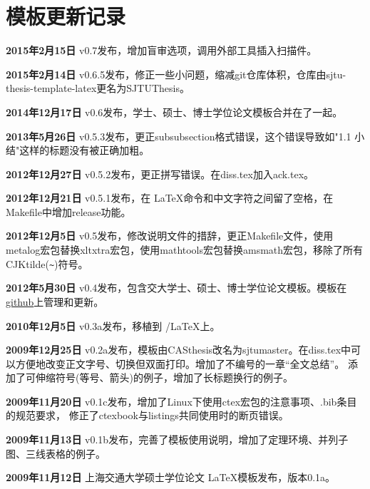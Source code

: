 \chapter{模板更新记录}
\label{chap:updatelog}

\textbf{2015年2月15日} v0.7发布，增加盲审选项，调用外部工具插入扫描件。

\textbf{2015年2月14日} v0.6.5发布，修正一些小问题，缩减git仓库体积，仓库由sjtu-thesis-template-latex更名为SJTUThesis。

\textbf{2014年12月17日} v0.6发布，学士、硕士、博士学位论文模板合并在了一起。

\textbf{2013年5月26日} v0.5.3发布，更正subsubsection格式错误，这个错误导致如"1.1 小结"这样的标题没有被正确加粗。

\textbf{2012年12月27日} v0.5.2发布，更正拼写错误。在diss.tex加入ack.tex。

\textbf{2012年12月21日} v0.5.1发布，在 \LaTeX 命令和中文字符之间留了空格，在Makefile中增加release功能。

\textbf{2012年12月5日} v0.5发布，修改说明文件的措辞，更正Makefile文件，使用metalog宏包替换xltxtra宏包，使用mathtools宏包替换amsmath宏包，移除了所有CJKtilde(\verb+~+)符号。

\textbf{2012年5月30日} v0.4发布，包含交大学士、硕士、博士学位论文模板。模板在\href{https://github.com/weijianwen/sjtu-thesis-template-latex}{github}上管理和更新。

\textbf{2010年12月5日} v0.3a发布，移植到 \XeTeX/\LaTeX 上。

\textbf{2009年12月25日} v0.2a发布，模板由CASthesis改名为sjtumaster。在diss.tex中可以方便地改变正文字号、切换但双面打印。增加了不编号的一章“全文总结”。
添加了可伸缩符号(等号、箭头)的例子，增加了长标题换行的例子。

\textbf{2009年11月20日} v0.1c发布，增加了Linux下使用ctex宏包的注意事项、.bib条目的规范要求，
修正了ctexbook与listings共同使用时的断页错误。

\textbf{2009年11月13日} v0.1b发布，完善了模板使用说明，增加了定理环境、并列子图、三线表格的例子。

\textbf{2009年11月12日} 上海交通大学硕士学位论文 \LaTeX 模板发布，版本0.1a。

